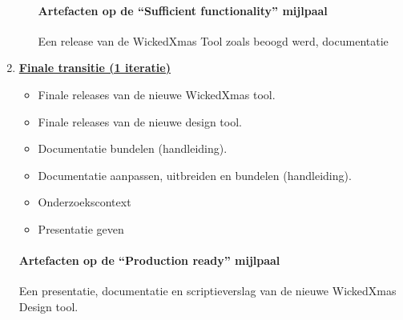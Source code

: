 \begin{enumerate}
\begin{itemize}
		\paragraph{Artefacten op de ``Sufficient functionality'' mijlpaal }
		 Een release van de WickedXmas Tool zoals beoogd werd,  documentatie
	\end{itemize}
\item \underline{\textbf{Finale transitie (1 iteratie)}}
	\begin{itemize}
		\item {\gray Finale releases van de nieuwe WickedXmas tool.}
		\item Finale releases van de nieuwe design tool.
		\item {\gray Documentatie bundelen (handleiding).}
		\item Documentatie aanpassen, uitbreiden en bundelen (handleiding).
		\item Onderzoekscontext
		\item Presentatie geven
	\end{itemize}
	\paragraph{Artefacten op de ``Production ready'' mijlpaal}
	 Een presentatie, documentatie en scriptieverslag van de nieuwe {\gray WickedXmas} Design tool.

\end{enumerate}